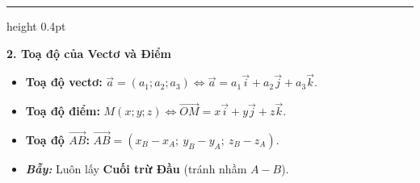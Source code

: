 \documentclass[12pt, a4paper]{article}
\begin{document}
\par\vspace{0.25cm}
\hrule height 0.4pt \relax
\par\vspace{0.25cm}

\noindent\textbf{\textcolor{amberorange}{\large 2. Toạ độ của Vectơ và Điểm}}
\par\vspace{0.1cm}

\noindent
\begin{minipage}[c]{0.67\linewidth}
    \begin{theorybox}
        \begin{itemize}\setlength{\itemsep}{3pt}\setlength{\parskip}{0pt}
            \item \textbf{Toạ độ vectơ:} $\vec{a} = (a_1; a_2; a_3) \iff \vec{a} = a_1\vec{i} + a_2\vec{j} + a_3\vec{k}$.
            \item \textbf{Toạ độ điểm:} $M(x; y; z) \iff \vec{OM} = x\vec{i} + y\vec{j} + z\vec{k}$.
            \item \textbf{Toạ độ $\vec{AB}$:} $\vec{AB} = (x_B - x_A;\ y_B - y_A;\ z_B - z_A)$.
            \item \textit{\textcolor{accentred}{\bfseries Bẫy:}} Luôn lấy \textbf{Cuối trừ Đầu} (tránh nhầm $A - B$).
        \end{itemize}
    \end{theorybox}
\end{minipage}\hfill
\end{document}

